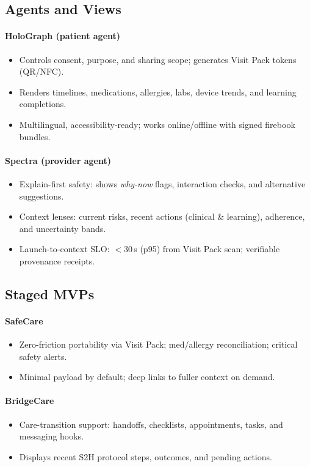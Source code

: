 \documentclass[11pt]{article}
\theoremstyle{plain}
\begin{document}
\subsection{Agents and Views}
\paragraph{HoloGraph (patient agent)}
\begin{itemize}
  \item Controls consent, purpose, and sharing scope; generates Visit Pack tokens (QR/NFC).
  \item Renders timelines, medications, allergies, labs, device trends, and learning completions.
  \item Multilingual, accessibility-ready; works online/offline with signed firebook bundles.
\end{itemize}

\paragraph{Spectra (provider agent)}
\begin{itemize}
  \item Explain-first safety: shows \emph{why-now} flags, interaction checks, and alternative suggestions.
  \item Context lenses: current risks, recent actions (clinical \& learning), adherence, and uncertainty bands.
  \item Launch-to-context SLO: $<$30\,s (p95) from Visit Pack scan; verifiable provenance receipts.
\end{itemize}

\subsection{Staged MVPs}
\paragraph{SafeCare}
\begin{itemize}
  \item Zero-friction portability via Visit Pack; med/allergy reconciliation; critical safety alerts.
  \item Minimal payload by default; deep links to fuller context on demand.
\end{itemize}
\paragraph{BridgeCare}
\begin{itemize}
  \item Care-transition support: handoffs, checklists, appointments, tasks, and messaging hooks.
  \item Displays recent S2H protocol steps, outcomes, and pending actions.
\end{itemize}
\end{document}

